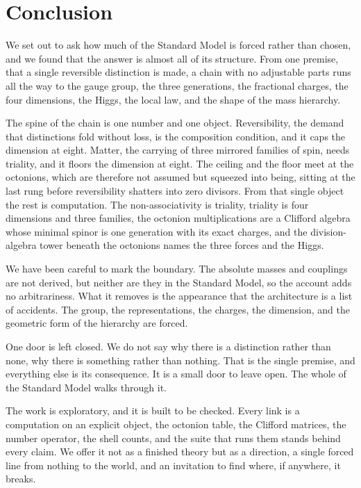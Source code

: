 \section{Conclusion}

We set out to ask how much of the Standard Model is forced rather than chosen, and we found that the answer is almost
all of its structure. From one premise, that a single reversible distinction is made, a chain with no adjustable parts
runs all the way to the gauge group, the three generations, the fractional charges, the four dimensions, the Higgs, the
local law, and the shape of the mass hierarchy.

The spine of the chain is one number and one object. Reversibility, the demand that distinctions fold without loss, is
the composition condition, and it caps the dimension at eight. Matter, the carrying of three mirrored families of spin,
needs triality, and it floors the dimension at eight. The ceiling and the floor meet at the octonions, which are
therefore not assumed but squeezed into being, sitting at the last rung before reversibility shatters into zero
divisors. From that single object the rest is computation. The non-associativity is triality, triality is four
dimensions and three families, the octonion multiplications are a Clifford algebra whose minimal spinor is one
generation with its exact charges, and the division-algebra tower beneath the octonions names the three forces and the
Higgs.

We have been careful to mark the boundary. The absolute masses and couplings are not derived, but neither are they in
the Standard Model, so the account adds no arbitrariness. What it removes is the appearance that the architecture is a
list of accidents. The group, the representations, the charges, the dimension, and the geometric form of the hierarchy
are forced.

One door is left closed. We do not say why there is a distinction rather than none, why there is something rather than
nothing. That is the single premise, and everything else is its consequence. It is a small door to leave open. The
whole of the Standard Model walks through it.

The work is exploratory, and it is built to be checked. Every link is a computation on an explicit object, the octonion
table, the Clifford matrices, the number operator, the shell counts, and the suite that runs them stands behind every
claim. We offer it not as a finished theory but as a direction, a single forced line from nothing to the world, and an
invitation to find where, if anywhere, it breaks.

